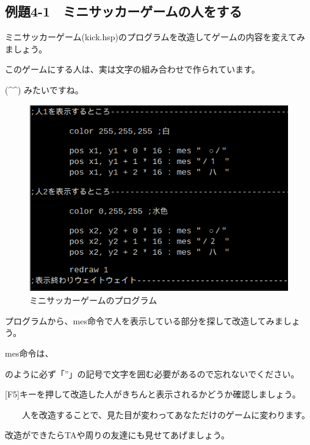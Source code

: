 \newpage
\subsection{例題4-1　ミニサッカーゲームの人をする}

\begin{description}
    \item {}
\end{description}

ミニサッカーゲーム(kick.hsp)のプログラムを改造してゲームの内容を変えてみましょう。

このゲームにする人は、実は文字の組み合わせで作られています。

(\^{}\^{}) みたいですね。


\begin{figure}[H]
    \begin{center}
      \includegraphics[keepaspectratio,width=12.326cm,height=8.123cm]{text04-img/s_kicksrc1.png}
      \caption{ミニサッカーゲームのプログラム}
    \end{center}
    \label{fig:prog_menu}
\end{figure}



プログラムから、mes命令で人を表示している部分を探して改造してみましょう。

mes命令は、

\begin{description}
    \item {}
\end{description}


のように必ず「”」の記号で文字を囲む必要があるので忘れないでください。

\begin{description}
    \item {}
\end{description}


[F5]キーを押して改造した人がきちんと表示されるかどうか確認しましょう。

\ \ \ \ 人を改造することで、見た目が変わってあなただけのゲームに変わります。

改造ができたらTAや周りの友達にも見せてあげましょう。

\clearpage





